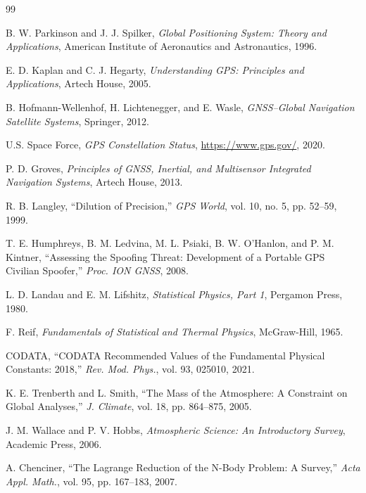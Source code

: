 \documentclass[twocolumn,10pt,a4paper]{article}
\theoremstyle{definition}
\theoremstyle{remark}
\begin{document}

\begin{thebibliography}{99}

B. W. Parkinson and J. J. Spilker,
\textit{Global Positioning System: Theory and Applications},
American Institute of Aeronautics and Astronautics, 1996.

E. D. Kaplan and C. J. Hegarty,
\textit{Understanding GPS: Principles and Applications},
Artech House, 2005.

B. Hofmann-Wellenhof, H. Lichtenegger, and E. Wasle,
\textit{GNSS--Global Navigation Satellite Systems},
Springer, 2012.

U.S. Space Force,
\textit{GPS Constellation Status},
\url{https://www.gps.gov/}, 2020.

P. D. Groves,
\textit{Principles of GNSS, Inertial, and Multisensor Integrated Navigation Systems},
Artech House, 2013.

R. B. Langley,
``Dilution of Precision,''
\textit{GPS World}, vol. 10, no. 5, pp. 52--59, 1999.

T. E. Humphreys, B. M. Ledvina, M. L. Psiaki, B. W. O'Hanlon, and P. M. Kintner,
``Assessing the Spoofing Threat: Development of a Portable GPS Civilian Spoofer,''
\textit{Proc. ION GNSS}, 2008.

L. D. Landau and E. M. Lifshitz,
\textit{Statistical Physics, Part 1},
Pergamon Press, 1980.

F. Reif,
\textit{Fundamentals of Statistical and Thermal Physics},
McGraw-Hill, 1965.

CODATA,
``CODATA Recommended Values of the Fundamental Physical Constants: 2018,''
\textit{Rev. Mod. Phys.}, vol. 93, 025010, 2021.

K. E. Trenberth and L. Smith,
``The Mass of the Atmosphere: A Constraint on Global Analyses,''
\textit{J. Climate}, vol. 18, pp. 864--875, 2005.

J. M. Wallace and P. V. Hobbs,
\textit{Atmospheric Science: An Introductory Survey},
Academic Press, 2006.

A. Chenciner,
``The Lagrange Reduction of the N-Body Problem: A Survey,''
\textit{Acta Appl. Math.}, vol. 95, pp. 167--183, 2007.


\end{thebibliography}
\end{document}
